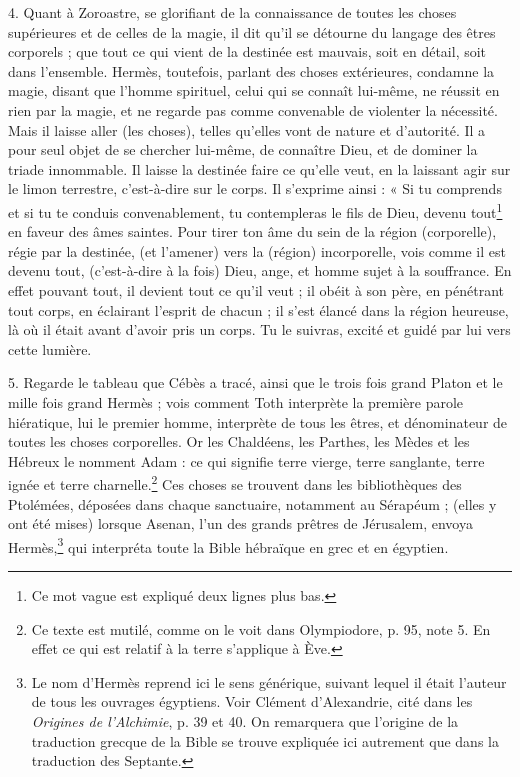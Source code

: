 \documentclass[a4paper, 11pt, oneside, polutonikogreek, french]{article}
\begin{document}
4. Quant à Zoroastre, se glorifiant de la connaissance de toutes les choses supérieures et de celles de la magie, il dit qu'il se détourne du langage des êtres corporels ; que tout ce qui vient de la destinée est mauvais, soit en détail, soit dans l'ensemble. Hermès, toutefois, parlant des choses extérieures, condamne la magie, disant que l'homme spirituel, celui qui se connaît lui-même, ne réussit en rien par la magie, et ne regarde pas comme convenable de violenter la nécessité. Mais il laisse aller (les choses), telles qu'elles vont de nature et d'autorité. Il a pour seul objet de se chercher lui-même, de connaître Dieu, et de dominer la triade innommable. Il laisse la destinée faire ce qu'elle veut, en la laissant agir sur le limon terrestre, c'est-à-dire sur le corps. Il s'exprime ainsi : « Si tu comprends et si tu te conduis convenablement, tu contempleras le fils de Dieu, devenu tout\footnote{Ce mot vague est expliqué deux lignes plus bas.} en faveur des âmes saintes. Pour tirer ton âme du sein de la région (corporelle), régie par la destinée, (et l'amener) vers la (région) incorporelle, vois comme il est devenu tout, (c'est-à-dire à la fois) Dieu, ange, et homme sujet à la souffrance. En effet pouvant tout, il devient tout ce qu'il veut ; il obéit à son père, en pénétrant tout corps, en éclairant l'esprit de chacun ; il s'est élancé dans la région heureuse, là où il était avant d'avoir pris un corps. Tu le suivras, excité et guidé par lui vers cette lumière.

5. Regarde le tableau que Cébès a tracé, ainsi que le trois fois grand Platon et le mille fois grand Hermès ; vois comment Toth interprète la première parole hiératique, lui le premier homme, interprète de tous les êtres, et dénominateur de toutes les choses corporelles. Or les Chaldéens, les Parthes, les Mèdes et les Hébreux le nomment Adam : ce qui signifie terre vierge, terre sanglante, terre ignée et terre charnelle.\footnote{Ce texte est mutilé, comme on le voit dans Olympiodore, p. 95, note 5. En effet ce qui est relatif à la terre s'applique à Ève.} Ces choses se trouvent dans les bibliothèques des Ptolémées, déposées dans chaque sanctuaire, notamment au Sérapéum ; (elles y ont été mises) lorsque Asenan, l'un des grands prêtres de Jérusalem, envoya Hermès,\footnote{Le nom d'Hermès reprend ici le sens générique, suivant lequel il était l'auteur de tous les ouvrages égyptiens. Voir Clément d'Alexandrie, cité dans les \emph{Origines de l'Alchimie}, p. 39 et 40. On remarquera que l'origine de la traduction grecque de la Bible se trouve expliquée ici autrement que dans la traduction des Septante.} qui interpréta toute la Bible hébraïque en grec et en égyptien.
\end{document}
